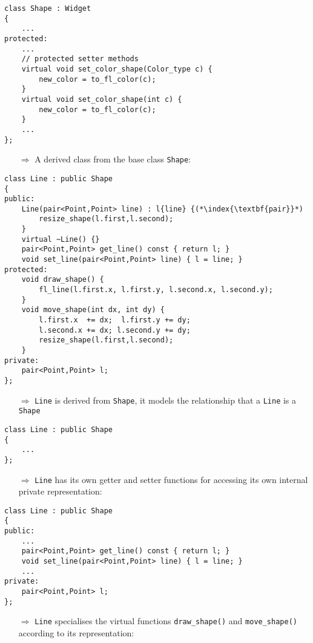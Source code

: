\documentclass[10pt]{article}
\begin{document}
\begin{lstlisting}
class Shape : Widget
{
    ...
protected:
    ...
    // protected setter methods
    virtual void set_color_shape(Color_type c) {
        new_color = to_fl_color(c);
    }
    virtual void set_color_shape(int c) {
        new_color = to_fl_color(c);
    }
    ...
};
\end{lstlisting}
\begin{enumerate}
\item[$\Rightarrow$] A derived class from the base class \texttt{Shape}:
\end{enumerate}
\begin{lstlisting}
class Line : public Shape
{
public:
    Line(pair<Point,Point> line) : l{line} {(*\index{\textbf{pair}}*)
        resize_shape(l.first,l.second);
    }
    virtual ~Line() {}
    pair<Point,Point> get_line() const { return l; }
    void set_line(pair<Point,Point> line) { l = line; }
protected:
    void draw_shape() {
        fl_line(l.first.x, l.first.y, l.second.x, l.second.y);
    }
    void move_shape(int dx, int dy) {
        l.first.x  += dx;  l.first.y += dy;
        l.second.x += dx; l.second.y += dy;
        resize_shape(l.first,l.second);
    }
private:
    pair<Point,Point> l;
};
\end{lstlisting}
\begin{enumerate}
\item[$\Rightarrow$] \texttt{Line} is derived from \texttt{Shape}, it models the relationship that a \texttt{Line} is a \texttt{Shape}
\end{enumerate}
\begin{lstlisting}
class Line : public Shape
{
    ...
};
\end{lstlisting}
\begin{enumerate}
\item[$\Rightarrow$] \texttt{Line} has its own getter and setter functions for accessing its own internal private representation:
\end{enumerate}
\begin{lstlisting}
class Line : public Shape
{
public:
    ...
    pair<Point,Point> get_line() const { return l; }
    void set_line(pair<Point,Point> line) { l = line; }
    ...
private:
    pair<Point,Point> l;
};
\end{lstlisting}
\begin{enumerate}
\item[$\Rightarrow$] \texttt{Line} specialises the virtual functions \texttt{draw\_shape()} and \texttt{move\_shape()} according to its representation:
\end{enumerate}
\end{document}
